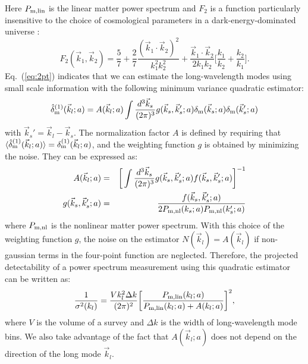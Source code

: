 \documentclass[prd,amsmath,amssymb,floatfix,superscriptaddress,nofootinbib,twocolumn]{revtex4-1}
\def\be{\begin{equation}}
\def\ee{\end{equation}}
\newcommand{\vs}{\nonumber\\}
\newcommand{\vk}{\vec{k}}
\newcommand{\ec}[1]{Eq.~(\ref{eq:#1})}
\newcommand{\eql}[1]{\label{eq:#1}}
\begin{document}
Here $P_{\rm m,lin}$ is the linear matter power spectrum and $F_{2}$ is a function particularly insensitive to the choice of cosmological parameters in a dark-energy-dominated universe \cite{Takahashi:2008to}:
\be
F_{2}(\vk_1,\vk_2)=\frac{5}{7}+\frac{2}{7}\frac{(\vk_1\cdot \vk_2)^2}{k_1^2 k_2^2}+\frac{\vk_1\cdot \vk_2}{2k_1k_2}\bigg[\frac{k_1}{k_2}+\frac{k_2}{k_1}\bigg].\eql{f2}
\ee
\ec{2pt} indicates that we can estimate the long-wavelength modes using small scale information with the following minimum variance quadratic estimator:
\begin{eqnarray}
\hat{\delta}^{(1)}_{\rm m}(\vec{k}_l;a)=A(\vec{k}_l;a)\int \frac{d^3 \vec{k}_s}{(2\pi)^3} g(\vec{k}_s,\vec{k}_s';a){\delta}_{\rm m}(\vec{k}_s;a){\delta}_{\rm m}(\vec{k}_s';a)\vs \eql{quadest}
\end{eqnarray} 
with $\vk_s'=\vk_l-\vk_s$. The normalization factor $A$ is defined by requiring that $\langle \hat{\delta}_{\rm m}^{(1)}(\vec{k}_l;a) \rangle={\delta}_{\rm m}^{(1)}(\vec{k}_l;a)$, and the weighting function $g$ is obtained by minimizing the noise. They can be expressed as:
\begin{eqnarray}
A(\vec{k}_l;a)&=&\bigg[\int \frac{d^3 \vec{k}_s}{(2\pi)^3} g(\vec{k}_s,\vec{k}_s';a)f(\vec{k}_s,\vec{k}_s';a)  \bigg]^{-1} \eql{a} \vs
g(\vec{k}_{s},\vec{k}_{s}';a)&=&\frac{f(\vec{k}_{s},\vec{k}_{s}';a)}{2P_{\rm m,nl}(k_{s};a)P_{\rm m,nl}(k_{s}';a)}
\end{eqnarray}
where $P_{\rm m,nl}$ is the nonlinear matter power spectrum. With this choice of the weighting function $g$, the noise on the estimator $N(\vk_l)=A(\vk_l)$ if non-gaussian terms in the four-point function are neglected. Therefore, the projected detectability of a power spectrum measurement using this quadratic estimator can be written as:
\be
\frac{1}{\sigma^{2}(k_l)}=\frac{V k_l^2 \Delta k }{(2\pi)^2}\bigg[\frac{P_{\rm m,lin}(k_l;a)}{P_{\rm m,lin}(k_l;a)+A(k_l;a) }\bigg]^2 \eql{error},
\ee
where $V$ is the volume of a survey and $\Delta k$ is the width of long-wavelength mode bins. We also take advantage of the fact that $A(\vk_l;a)$ does not depend on the direction of the long mode $\vk_l$.
\end{document}
